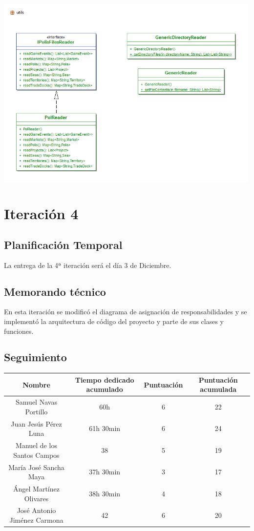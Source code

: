 \documentclass[11 pt]{book}
\begin{document}
\begin{center}
		    \includegraphics[width=500px]{design-uml/iteration3/package-utils.png}
		\end{center}
		
\chapter{Iteración 4}
	\section{Planificación Temporal}
		La entrega de la 4ª iteración será el día 3 de Diciembre.

	\section{Memorando técnico}
		En esta iteración se modificó el diagrama de asignación de responsabilidades y se implementó la arquitectura de código del proyecto y parte de sus clases y funciones.

	\section{Seguimiento}
		\begin{tabular}{|c|c|c|c|}
			\hline
			Nombre & Tiempo dedicado acumulado & Puntuación & Puntuación acumulada\\
			\hline
			Samuel Navas Portillo & 60h & 6 & 22\\
			Juan Jesús Pérez Luna & 61h 30min & 6 & 24\\
			Manuel de los Santos Campos & 38 & 5 & 19\\
			María José Sancha Maya & 37h 30min & 3 & 17\\
			Ángel Martínez Olivares & 38h 30min & 4 & 18\\
			José Antonio Jiménez Carmona & 42 & 6 & 20\\
			\hline
		\end{tabular}
\end{document}
